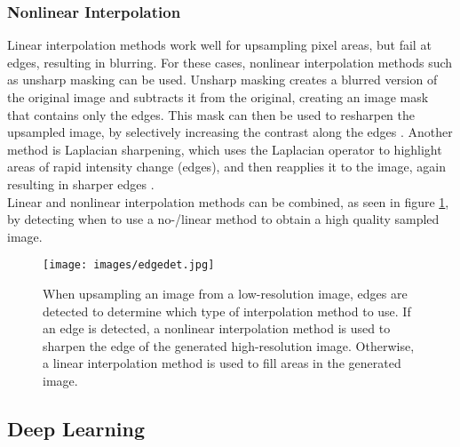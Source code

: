 \documentclass[letterpaper, 10 pt, conference]{ieeeconf}  %
\begin{document}
\subsubsection{Nonlinear Interpolation}

Linear interpolation methods work well for upsampling pixel areas, but fail at edges, resulting in blurring.
For these cases, nonlinear interpolation methods such as unsharp masking can be used. 
Unsharp masking creates a blurred version of the original image and subtracts it from the original, creating an image mask that contains only the edges.
This mask can then be used to resharpen the upsampled image, by selectively increasing the contrast along the edges \cite{deng2010generalized} \cite{unmask}.
Another method is Laplacian sharpening, which uses the Laplacian operator to highlight areas of rapid intensity change (edges), and then reapplies it to the image, again resulting in sharper edges \cite{wang2022interpolation}.\\
Linear and nonlinear interpolation methods can be combined, as seen in figure \ref{fig:edge_det}, by detecting when to use a no-/linear method to obtain a high quality sampled image.

\begin{figure}[!ht]
        \caption{When upsampling an image from a low-resolution image, edges are detected to determine which type of interpolation method to use.
                If an edge is detected, a nonlinear interpolation method is used to sharpen the edge of the generated high-resolution image. 
                Otherwise, a linear interpolation method is used to fill areas in the generated image.}
        \centering
        \texttt{[image: images/edgedet.jpg]}
        \label{fig:edge_det}
    \end{figure}

\subsection{Deep Learning}
\end{document}
